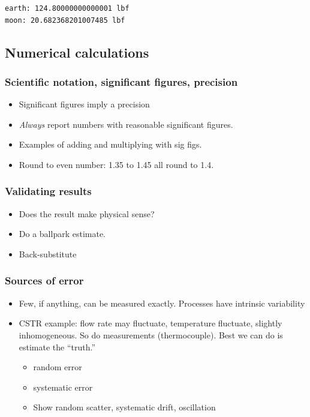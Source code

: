 \documentclass[11pt]{article}
\begin{document}
\begin{verbatim}
earth: 124.80000000000001 lbf
moon: 20.682368201007485 lbf
\end{verbatim}

\subsection{Numerical calculations}
\label{sec-3-7}
\subsubsection{Scientific notation, significant figures, precision}
\label{sec-3-7-1}
\begin{itemize}
\item Significant figures imply a precision
\item \emph{Always} report numbers with reasonable significant figures.
\item Examples of adding and multiplying with sig figs.
\item Round to even number: 1.35 to 1.45 all round to 1.4.
\end{itemize}
\subsubsection{Validating results}
\label{sec-3-7-2}
\begin{itemize}
\item Does the result make physical sense?
\item Do a ballpark estimate.
\item Back-substitute
\end{itemize}
\subsubsection{Sources of error}
\label{sec-3-7-3}
\begin{itemize}
\item Few, if anything, can be measured exactly.  Processes have intrinsic variability
\item CSTR example: flow rate may fluctuate, temperature fluctuate, slightly inhomogeneous.  So do measurements (thermocouple).  Best we can do is estimate the ``truth.''
\begin{itemize}
\item random error
\item systematic error
\item Show random scatter, systematic drift, oscillation
\end{itemize}
\end{itemize}
\end{document}
